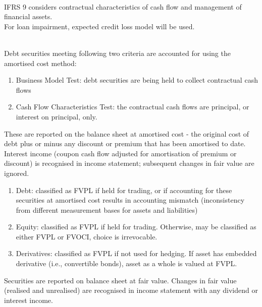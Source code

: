 \begin{definition} \\
IFRS 9 considers contractual characteristics of cash flow and management of financial assets.\\
For loan impairment, expected credit loss model will be used.
\end{definition}

\begin{method} \\
Debt securities meeting following two criteria are accounted for using the amortised cost method:
\begin{enumerate}[label=\roman*.]
\setlength{\itemsep}{0pt}
\item Business Model Test: debt securities are being held to collect contractual cash flows
\item Cash Flow Characteristics Test: the contractual cash flows are principal, or interest on principal, only.
\end{enumerate}
These are reported on the balance sheet at amortised cost - the original cost of debt plus or minus any discount or premium that has been amortised to date.\\
Interest income (coupon cash flow adjusted for amortisation of premium or discount) is recognised in income statement; subsequent changes in fair value are ignored.
\end{method}

\begin{method} 
\begin{enumerate}[label=\roman*.]
\setlength{\itemsep}{0pt}
\item Debt: classified as FVPL if held for trading, or if accounting for these securities at amortised cost results in accounting mismatch (inconsistency from different measurement bases for assets and liabilities)
\item Equity: classified as FVPL if held for trading. Otherwise, may be classified as either FVPL or FVOCI, choice is irrevocable.
\item Derivatives: classified as FVPL if not used for hedging. If asset has embedded derivative (i.e., convertible bonds), asset as a whole is valued at FVPL.
\end{enumerate}
Securities are reported on balance sheet at fair value. Changes in fair value (realised and unrealised) are recognised in income statement with any dividend or interest income.
\end{method}

